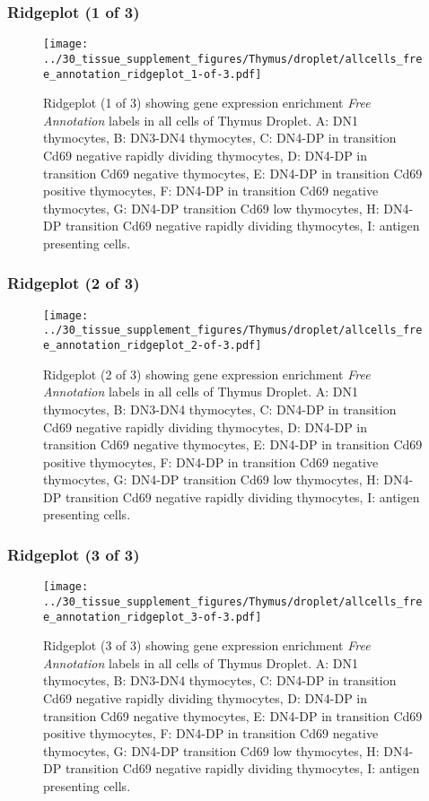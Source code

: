 \clearpage

\subsubsection{Ridgeplot (1 of 3)}
\begin{figure}[h]
\centering
\texttt{[image: ../30\_tissue\_supplement\_figures/Thymus/droplet/allcells\_free\_annotation\_ridgeplot\_1-of-3.pdf]}

\caption{ Ridgeplot (1 of 3)  showing gene expression enrichment \emph{Free Annotation} labels in all cells of Thymus Droplet. A: DN1 thymocytes, B: DN3-DN4 thymocytes, C: DN4-DP in transition Cd69 negative rapidly dividing thymocytes, D: DN4-DP in transition Cd69 negative thymocytes, E: DN4-DP in transition Cd69 positive thymocytes, F: DN4-DP in transition Cd69 negative thymocytes, G: DN4-DP transition Cd69 low thymocytes, H: DN4-DP transition Cd69 negative rapidly dividing thymocytes, I: antigen presenting cells.}
\end{figure}


\clearpage

\subsubsection{Ridgeplot (2 of 3)}
\begin{figure}[h]
\centering
\texttt{[image: ../30\_tissue\_supplement\_figures/Thymus/droplet/allcells\_free\_annotation\_ridgeplot\_2-of-3.pdf]}

\caption{ Ridgeplot (2 of 3)  showing gene expression enrichment \emph{Free Annotation} labels in all cells of Thymus Droplet. A: DN1 thymocytes, B: DN3-DN4 thymocytes, C: DN4-DP in transition Cd69 negative rapidly dividing thymocytes, D: DN4-DP in transition Cd69 negative thymocytes, E: DN4-DP in transition Cd69 positive thymocytes, F: DN4-DP in transition Cd69 negative thymocytes, G: DN4-DP transition Cd69 low thymocytes, H: DN4-DP transition Cd69 negative rapidly dividing thymocytes, I: antigen presenting cells.}
\end{figure}


\clearpage

\subsubsection{Ridgeplot (3 of 3)}
\begin{figure}[h]
\centering
\texttt{[image: ../30\_tissue\_supplement\_figures/Thymus/droplet/allcells\_free\_annotation\_ridgeplot\_3-of-3.pdf]}

\caption{ Ridgeplot (3 of 3)  showing gene expression enrichment \emph{Free Annotation} labels in all cells of Thymus Droplet. A: DN1 thymocytes, B: DN3-DN4 thymocytes, C: DN4-DP in transition Cd69 negative rapidly dividing thymocytes, D: DN4-DP in transition Cd69 negative thymocytes, E: DN4-DP in transition Cd69 positive thymocytes, F: DN4-DP in transition Cd69 negative thymocytes, G: DN4-DP transition Cd69 low thymocytes, H: DN4-DP transition Cd69 negative rapidly dividing thymocytes, I: antigen presenting cells.}
\end{figure}


